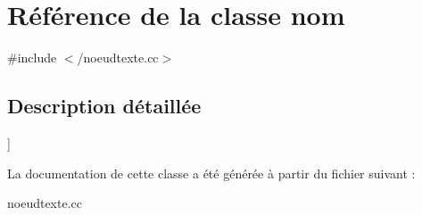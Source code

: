 \hypertarget{classnom}{
\section{Référence de la classe nom}
\label{classnom}
}


{\ttfamily \#include $<$/noeudtexte.cc$>$}



\subsection{Description détaillée}
\mbox{]} 

La documentation de cette classe a été générée à partir du fichier suivant :\begin{DoxyCompactItemize}
\item 
noeudtexte.cc\end{DoxyCompactItemize}
